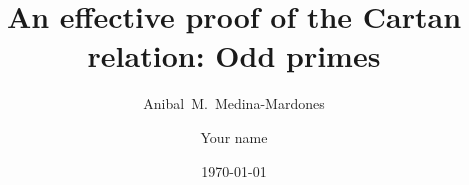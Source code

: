 \documentclass{amsart}
\title{An effective proof of the Cartan relation: Odd primes}
\author[A.~Medina-Mardones]{Anibal~M.~Medina-Mardones}
\author[Your short name]{Your name}
\date{\today}
\begin{document}
	
	\maketitle
	
	
	
	
	
	\sloppy
	\printbibliography
\end{document}
